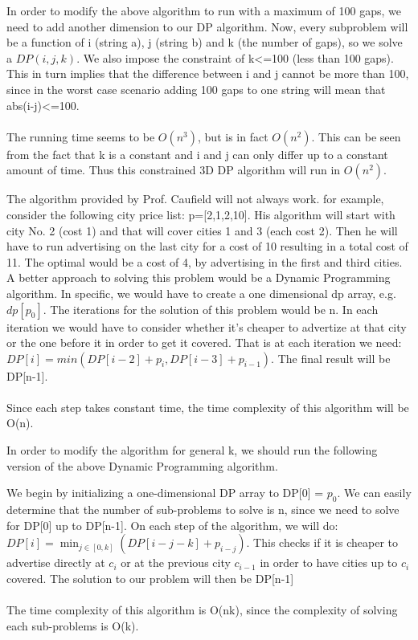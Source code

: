 \documentclass[12pt,twoside]{article}
\begin{document}
\begin{problems}
\begin{problemparts}
\problempart 
In order to modify the above algorithm to run with a maximum of 100 gaps, we need to add another dimension to our DP algorithm. Now, every subproblem will be a function of i (string a), j (string b) and k (the number of gaps), so we solve a $DP(i,j,k)$. We also impose the constraint of k<=100 (less than 100 gaps). This in turn implies that the difference between i and j cannot be more than 100, since in the worst case scenario adding 100 gaps to one string will mean that abs(i-j)<=100. 
\\\\ The running time seems to be $O(n^3)$, but is in fact $O(n^2)$. This can be seen from the fact that k is a constant and i and j can only differ up to a constant amount of time. Thus this constrained 3D DP algorithm will run in $O(n^2)$.
\end{problemparts}

\problem  %

\begin{problemparts}
\problempart 
The algorithm provided by Prof. Caufield will not always work. for example, consider the following city price list: p=[2,1,2,10]. His algorithm will start with city No. 2 (cost 1) and that will cover cities 1 and 3 (each cost 2). Then he will have to run advertising on the last city for a cost of 10 resulting in a total cost of 11. The optimal would be a cost of 4, by advertising in the first and third cities. 
\problempart
A better approach to solving this problem would be a Dynamic Programming algorithm. In specific, we would have to create a one dimensional dp array, e.g. $dp[p_0]$. The iterations for the solution of this problem would be n. In each iteration we would have to consider whether it's cheaper to advertize at that city or the one before it in order to get it covered. That is at each iteration we need: $DP[i]=min(DP[i-2]+p_i, DP[i-3]+p_{i-1})$. The final result will be DP[n-1].
\\\\Since each step takes constant time, the time complexity of this algorithm will be O(n).

\problempart In order to modify the algorithm for general k, we should run the following version of the above Dynamic Programming algorithm. 

We begin by initializing a one-dimensional DP array to  DP[0] = $p_0$. We can easily determine that the number of sub-problems to solve is n, since we need to solve for DP[0] up to DP[n-1]. On each step of the algorithm, we will do: $DP[i] = \min_{j \in [0,k]}(DP[i - j - k] + p_{i-j})$. This checks if  it is cheaper to advertise directly at $c_i$ or at the previous city $c_{i-1}$ in order to have cities up to $c_i$ covered. The solution to our problem will then be DP[n-1]
\\\\ The time complexity of this algorithm is O(nk), since the complexity of solving each sub-problems is O(k).
\end{problemparts}


\end{problems}
\end{document}
